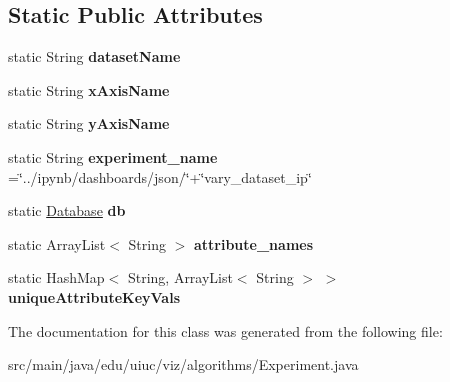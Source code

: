 \subsection*{Static Public Attributes}
\begin{DoxyCompactItemize}
\item 
\mbox{\label{classedu_1_1uiuc_1_1viz_1_1algorithms_1_1_experiment_aa3123decc7f8810d78bb2ca2b12ec089}} 
static String {\bfseries dataset\+Name}
\item 
\mbox{\label{classedu_1_1uiuc_1_1viz_1_1algorithms_1_1_experiment_a8c5b1d5f36c24465840cef0bacd8ba22}} 
static String {\bfseries x\+Axis\+Name}
\item 
\mbox{\label{classedu_1_1uiuc_1_1viz_1_1algorithms_1_1_experiment_ac040d070e1bf488783a30938cd2119f4}} 
static String {\bfseries y\+Axis\+Name}
\item 
\mbox{\label{classedu_1_1uiuc_1_1viz_1_1algorithms_1_1_experiment_aee7b59b20ef7e41159671111ea31fe59}} 
static String {\bfseries experiment\+\_\+name} =\char`\"{}../ipynb/dashboards/json/\char`\"{}+\char`\"{}vary\+\_\+dataset\+\_\+ip\char`\"{}
\item 
\mbox{\label{classedu_1_1uiuc_1_1viz_1_1algorithms_1_1_experiment_a75b2d4c705175f2c3716b6e04f27892d}} 
static \mbox{\hyperlink{classedu_1_1uiuc_1_1viz_1_1lattice_1_1_database}{Database}} {\bfseries db}
\item 
\mbox{\label{classedu_1_1uiuc_1_1viz_1_1algorithms_1_1_experiment_a39d3162e851ad4ae262fc6c4affabf7b}} 
static Array\+List$<$ String $>$ {\bfseries attribute\+\_\+names}
\item 
\mbox{\label{classedu_1_1uiuc_1_1viz_1_1algorithms_1_1_experiment_ab35e0234c8ed1256e257be5930aed766}} 
static Hash\+Map$<$ String, Array\+List$<$ String $>$ $>$ {\bfseries unique\+Attribute\+Key\+Vals}
\end{DoxyCompactItemize}


The documentation for this class was generated from the following file\+:\begin{DoxyCompactItemize}
\item 
src/main/java/edu/uiuc/viz/algorithms/Experiment.\+java\end{DoxyCompactItemize}
